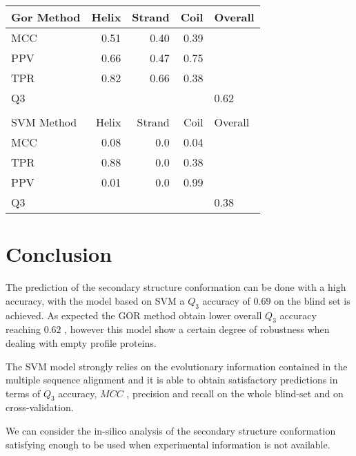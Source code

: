 \documentclass[a4paper,twocolumn]{article}
\begin{document}
\begin{center}
\begin{tabular}{lrrrl}
Gor Method & Helix & Strand & Coil & Overall\\
\hline
MCC & 0.51 & 0.40 & 0.39 & \\
PPV & 0.66 & 0.47 & 0.75 & \\
TPR & 0.82 & 0.66 & 0.38 & \\
Q3 &  &  &  & 0.62\\
 &  &  &  & \\
SVM Method & Helix & Strand & Coil & Overall\\
\hline
MCC & 0.08 & 0.0 & 0.04 & \\
TPR & 0.88 & 0.0 & 0.38 & \\
PPV & 0.01 & 0.0 & 0.99 & \\
Q3 &  &  &  & 0.38\\
\end{tabular}
\end{center}

\section{Conclusion}
\label{sec:org179bdd1}
The prediction of the secondary structure conformation can be done with a high
accuracy, with the model based on SVM a \(Q_{3}\) accuracy of \(0.69\) on the blind
set is achieved. As expected the GOR method obtain lower overall \(Q_{3}\)
accuracy reaching \(0.62\) , however this model show a certain degree of robustness
when dealing with empty profile proteins.


The SVM model strongly relies on the evolutionary information contained in the
multiple sequence alignment and it is able to obtain satisfactory predictions in
terms of \(Q_{3}\) accuracy, \(MCC\) , precision and recall on the whole blind-set
and on cross-validation.

We can consider the in-silico analysis of the secondary structure conformation
satisfying enough to be used when experimental information is not available.





\end{document}
